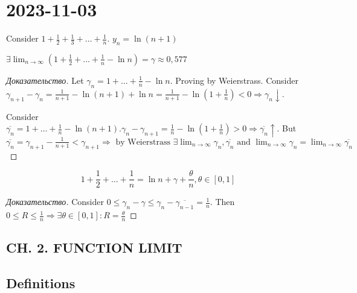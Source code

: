 \section{2023-11-03}

Consider $1 + \frac{1}{2} + \frac{1}{3} + \dots + \frac{1}{n}$. $y_n = \ln (n+1)$

\begin{lemma}
	$\exists \lim_{n \to \infty} \left( 1 + \frac{1}{2} + \dots + \frac{1}{n} - \ln n \right) = \gamma \approx 0,577 $
\end{lemma}

\begin{proof}[Доказательство]
	Let $\gamma_n = 1 + \dots + \frac{1}{n} - \ln n$. Proving by Weierstrass. Consider $\gamma_{n+1} - \gamma_n = \frac{1}{n+1} - \ln \left( n + 1 \right)  + \ln n = \frac{1}{n+1} - \ln \left( 1 + \frac{1}{n} \right) < 0 \Rightarrow \gamma_n \downarrow$.

	Consider $\overline{\gamma_n} = 1 + \dots + \frac{1}{n} - \ln \left( n+1 \right). \gamma_n - \gamma_{n+1} = \frac{1}{n}- \ln \left( 1 + \frac{1}{n} \right) > 0 \Rightarrow \overline{\gamma_n} \uparrow $. But $\overline{\gamma_n} = \gamma_{n+1} - \frac{1}{n+1} < \gamma_{n+1} \Rightarrow \text{ by Weierstrass } \exists \lim_{n \to \infty} \gamma_n, \overline{\gamma_n} \text{ and  } \lim_{n \to \infty} \gamma_n = \lim_{n \to \infty} \overline{\gamma_n}$
\end{proof}

\begin{note}[]
	\[
		1 + \frac{1}{2} + \dots + \frac{1}{n} = \ln n + \gamma + \frac{\theta}{n}, \theta \in \left[ 0, 1 \right]
	\]
\end{note}

\begin{proof}[Доказательство]
	Consider $0 \leq \gamma_n - \gamma \leq \gamma_n - \overline{\gamma_{n-1}} = \frac{1}{n}$. Then $0 \leq R \leq \frac{1}{n} \Rightarrow \exists \theta \in \left[ 0, 1 \right]: R = \frac{\theta}{n}$
\end{proof}

\subsection{CH. 2. FUNCTION LIMIT}

\subsection{Definitions}


